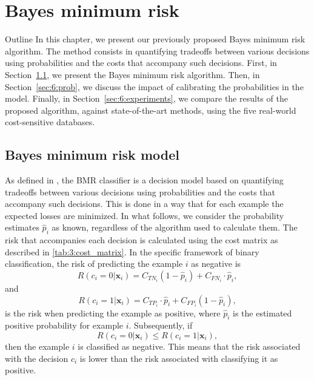 \chapter{Bayes minimum risk}\label{ch:6}

\begin{remark}{Outline}
In this chapter, we present our previously proposed Bayes minimum risk algorithm. The method 
consists in quantifying tradeoffs between various decisions using probabilities and the costs that 
accompany such decisions. First, in Section~\ref{sec:6:bmr}, we present the Bayes minimum risk 
algorithm. Then, in Section~\ref{sec:6:prob}, we discuss the impact of calibrating the probabilities 
in the model. Finally, in Section~\ref{sec:6:experiments}, we compare the results of the proposed 
algorithm, against state-of-the-art methods, using the five real-world cost-sensitive databases.
\end{remark}


\section{Bayes minimum risk model}
\label{sec:6:bmr}


As defined in \citep{Ghosh2006}, the BMR classifier is a decision model based on quantifying 
tradeoffs between various decisions using probabilities and the costs that accompany such decisions. 
This is done in a way that for each example the expected losses are minimized. In  what follows, we 
consider the probability estimates $\hat p_i$ as known, regardless of the algorithm used to 
calculate them.  The risk that accompanies each decision is calculated using the cost matrix 
as described in \tablename{ \ref{tab:3:cost_matrix}}. In the specific framework of binary 
classification, the risk of predicting the example $i$ as negative is 
\begin{equation}
  R(c_i=0|\mathbf{x}_i)=C_{TN_i}(1-\hat p_i)+C_{FN_i} \cdot \hat p_i, 
\end{equation}
and
\begin{equation}
  R(c_i=1|\mathbf{x}_i)=C_{TP_i} \cdot \hat p_i + C_{FP_i}(1- \hat p_i), 
\end{equation}
is the risk when predicting the example as positive, where $\hat p_i$ is the estimated positive 
probability for example $i$. Subsequently, if 
\begin{equation}
  R(c_i=0|\mathbf{x}_i) \le R(c_i=1|\mathbf{x}_i), 
\end{equation}
then  the example $i$ is classified as negative. This means that the risk associated with the 
decision $c_i$ is lower than the risk associated with classifying it as positive. 

